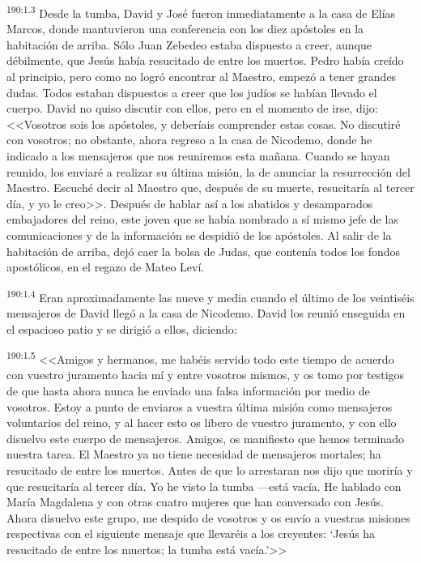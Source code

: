 \par 
\textsuperscript{190:1.3} Desde la tumba, David y José fueron inmediatamente a la casa de Elías Marcos, donde mantuvieron una conferencia con los diez apóstoles en la habitación de arriba. Sólo Juan Zebedeo estaba dispuesto a creer, aunque débilmente, que Jesús había resucitado de entre los muertos. Pedro había creído al principio, pero como no logró encontrar al Maestro, empezó a tener grandes dudas. Todos estaban dispuestos a creer que los judíos se habían llevado el cuerpo. David no quiso discutir con ellos, pero en el momento de irse, dijo: <<Vosotros sois los apóstoles, y deberíais comprender estas cosas. No discutiré con vosotros; no obstante, ahora regreso a la casa de Nicodemo, donde he indicado a los mensajeros que nos reuniremos esta mañana. Cuando se hayan reunido, los enviaré a realizar su última misión, la de anunciar la resurrección del Maestro. Escuché decir al Maestro que, después de su muerte, resucitaría al tercer día, y yo le creo>>. Después de hablar así a los abatidos y desamparados embajadores del reino, este joven que se había nombrado a sí mismo jefe de las comunicaciones y de la información se despidió de los apóstoles. Al salir de la habitación de arriba, dejó caer la bolsa de Judas, que contenía todos los fondos apostólicos, en el regazo de Mateo Leví.

\par 
\textsuperscript{190:1.4} Eran aproximadamente las nueve y media cuando el último de los veintiséis mensajeros de David llegó a la casa de Nicodemo. David los reunió enseguida en el espacioso patio y se dirigió a ellos, diciendo:

\par 
\textsuperscript{190:1.5} <<Amigos y hermanos, me habéis servido todo este tiempo de acuerdo con vuestro juramento hacia mí y entre vosotros mismos, y os tomo por testigos de que hasta ahora nunca he enviado una falsa información por medio de vosotros. Estoy a punto de enviaros a vuestra última misión como mensajeros voluntarios del reino, y al hacer esto os libero de vuestro juramento, y con ello disuelvo este cuerpo de mensajeros. Amigos, os manifiesto que hemos terminado nuestra tarea. El Maestro ya no tiene necesidad de mensajeros mortales; ha resucitado de entre los muertos. Antes de que lo arrestaran nos dijo que moriría y que resucitaría al tercer día. Yo he visto la tumba ---está vacía. He hablado con María Magdalena y con otras cuatro mujeres que han conversado con Jesús. Ahora disuelvo este grupo, me despido de vosotros y os envío a vuestras misiones respectivas con el siguiente mensaje que llevaréis a los creyentes: `Jesús ha resucitado de entre los muertos; la tumba está vacía.'>>

